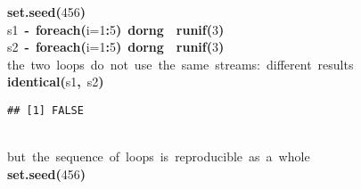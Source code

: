 \documentclass[a4paper,12pt]{article}\usepackage{graphicx, color}
\makeatletter
\newcommand{\hlnumber}[1]{\textcolor[rgb]{0,0,0}{#1}}%
\newcommand{\hlfunctioncall}[1]{\textcolor[rgb]{0.501960784313725,0,0.329411764705882}{\textbf{#1}}}%
\newcommand{\hlkeyword}[1]{\textcolor[rgb]{0,0,0}{\textbf{#1}}}%
\newcommand{\hlargument}[1]{\textcolor[rgb]{0.690196078431373,0.250980392156863,0.0196078431372549}{#1}}%
\newcommand{\hlcomment}[1]{\textcolor[rgb]{0.180392156862745,0.6,0.341176470588235}{#1}}%
\newcommand{\hlassignement}[1]{\textcolor[rgb]{0,0,0}{\textbf{#1}}}%
\newcommand{\hlsymbol}[1]{\textcolor[rgb]{0,0,0}{#1}}%
\newcommand{\hlstd}[1]{\textcolor[rgb]{0,0,0}{#1}}%
\newenvironment{kframe}{%
 \def\FrameCommand##1{\hskip\@totalleftmargin \hskip-\fboxsep
 \colorbox{shadecolor}{##1}\hskip-\fboxsep
     \hskip-\linewidth \hskip-\@totalleftmargin \hskip\columnwidth}%
 \MakeFramed {\advance\hsize-\width
   \@totalleftmargin\z@ \linewidth\hsize
   \@setminipage}}%
 {\par\unskip\endMakeFramed}
\newenvironment{knitrout}{}{} %
\renewenvironment{knitrout}{\begin{footnotesize}}{\end{footnotesize}}
\makeatother
\begin{document}
\begin{knitrout}
\color{fgcolor}\begin{kframe}
\begin{flushleft}
\ttfamily\noindent
\hlfunctioncall{set.seed}\hlkeyword{(}\hlnumber{456}\hlkeyword{)}\hspace*{\fill}\\
\hlstd{}\hlsymbol{s1}{\ }\hlassignement{\usebox{\hlnormalsizeboxlessthan}-}{\ }\hlfunctioncall{foreach}\hlkeyword{(}\hlargument{i}\hlargument{=}\hlnumber{1}\hlkeyword{:}\hlnumber{5}\hlkeyword{)}{\ }\hlkeyword{\usebox{\hlnormalsizeboxpercent}dorng\usebox{\hlnormalsizeboxpercent}}{\ }\hlkeyword{\usebox{\hlnormalsizeboxopenbrace}}{\ }\hlfunctioncall{runif}\hlkeyword{(}\hlnumber{3}\hlkeyword{)}{\ }\hlkeyword{\usebox{\hlnormalsizeboxclosebrace}}\hspace*{\fill}\\
\hlstd{}\hlsymbol{s2}{\ }\hlassignement{\usebox{\hlnormalsizeboxlessthan}-}{\ }\hlfunctioncall{foreach}\hlkeyword{(}\hlargument{i}\hlargument{=}\hlnumber{1}\hlkeyword{:}\hlnumber{5}\hlkeyword{)}{\ }\hlkeyword{\usebox{\hlnormalsizeboxpercent}dorng\usebox{\hlnormalsizeboxpercent}}{\ }\hlkeyword{\usebox{\hlnormalsizeboxopenbrace}}{\ }\hlfunctioncall{runif}\hlkeyword{(}\hlnumber{3}\hlkeyword{)}{\ }\hlkeyword{\usebox{\hlnormalsizeboxclosebrace}}\hspace*{\fill}\\
\hlstd{}\hlcomment{\usebox{\hlnormalsizeboxhash}{\ }the{\ }two{\ }loops{\ }do{\ }not{\ }use{\ }the{\ }same{\ }streams:{\ }different{\ }results}\hspace*{\fill}\\
\hlstd{}\hlfunctioncall{identical}\hlkeyword{(}\hlsymbol{s1}\hlkeyword{,}{\ }\hlsymbol{s2}\hlkeyword{)}\mbox{}
\normalfont
\end{flushleft}
\begin{verbatim}
## [1] FALSE
\end{verbatim}
\begin{flushleft}
\ttfamily\noindent
\hspace*{\fill}\\
\hlstd{}\hlcomment{\usebox{\hlnormalsizeboxhash}{\ }but{\ }the{\ }sequence{\ }of{\ }loops{\ }is{\ }reproducible{\ }as{\ }a{\ }whole}\hspace*{\fill}\\
\hlstd{}\hlfunctioncall{set.seed}\hlkeyword{(}\hlnumber{456}\hlkeyword{)}\hspace*{\fill}\\

\end{flushleft}
\end{kframe}
\end{knitrout}
\end{document}
